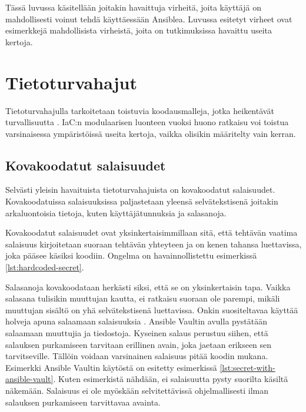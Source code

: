 Tässä luvussa käsitellään joitakin havaittuja virheitä, joita käyttäjä on mahdollisesti
voinut tehdä käyttäessään Ansiblea. Luvussa esitetyt virheet ovat esimerkkejä
mahdollisista virheistä, joita on tutkimuksissa \parencite{RahmanAkond2021SSiA,
    RahmanAkond2019TSSS, KumaraIndika2021Tdad} havaittu useita kertoja.

\section{Tietoturvahajut}

Tietoturvahajulla tarkoitetaan toistuvia koodausmalleja, jotka heikentävät turvallisuutta
\parencite{RahmanAkond2021SSiA}. IaC:n modulaarisen luonteen vuoksi huono ratkaisu voi
toistua varsinaisessa ympäristöissä useita kertoja, vaikka olisikin määritelty vain
kerran.

\subsection{Kovakoodatut salaisuudet}

Selvästi yleisin havaituista tietoturvahajuista on kovakoodatut salaisuudet. Kovakoodatuissa
salaisuuksissa paljastetaan yleensä selvätekstisenä joitakin arkaluontoisia tietoja, kuten
käyttäjätunnuksia ja salasanoja. \parencite{RahmanAkond2019TSSS}

Kovakoodatut salaisuudet ovat yksinkertaisimmillaan sitä, että tehtävän vaatima salaisuus
kirjoitetaan suoraan tehtävän yhteyteen ja on kenen tahansa luettavissa, joka pääsee käsiksi
koodiin. Ongelma on havainnollistettu esimerkissä \ref{lst:hardcoded-secret}.



Salasanoja kovakoodataan herkästi siksi, että se on yksinkertaisin tapa. Vaikka salasana tulisikin
muuttujan kautta, ei ratkaisu suoraan ole parempi, mikäli muuttujan sisältö on yhä selvätekstisenä
luettavissa. Onkin suositeltavaa käyttää holveja apuna salaamaan salaisuuksia
\parencite{RahmanAkond2019TSSS}. Ansible Vaultin avulla pystätään salaamaan muuttujia ja tiedostoja.
Kyseinen salaus perustuu siihen, että salauksen purkamiseen tarvitaan erillinen avain, joka jaetaan
erikseen sen tarvitseville. Tällöin voidaan varsinainen salaisuus pitää koodin mukana. Esimerkki
Ansible Vaultin käytöstä on esitetty esimerkissä \ref{lst:secret-with-ansible-vault}. Kuten
esimerkistä nähdään, ei salaisuutta pysty suorilta käsiltä näkemään. Salaisuus ei ole myöskään
selvitettävissä ohjelmallisesti ilman salauksen purkamiseen tarvittavaa avainta.

